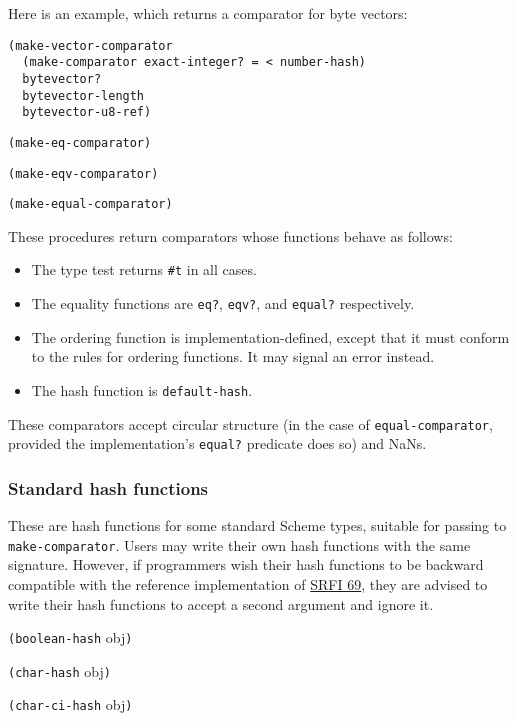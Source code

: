 Here is an example, which returns a comparator for byte vectors:

\begin{verbatim}
(make-vector-comparator
  (make-comparator exact-integer? = < number-hash)
  bytevector?
  bytevector-length
  bytevector-u8-ref)
\end{verbatim}

\texttt{(make-eq-comparator)}

\texttt{(make-eqv-comparator)}

\texttt{(make-equal-comparator)}

These procedures return comparators whose functions behave as follows:

\begin{itemize}
\item
  The type test returns \texttt{\#t} in all cases.
\item
  The equality functions are \texttt{eq?}, \texttt{eqv?}, and
  \texttt{equal?} respectively.
\item
  The ordering function is implementation-defined, except that it must
  conform to the rules for ordering functions. It may signal an error
  instead.
\item
  The hash function is \texttt{default-hash}.
\end{itemize}

These comparators accept circular structure (in the case of
\texttt{equal-comparator}, provided the implementation's \texttt{equal?}
predicate does so) and NaNs.

\hypertarget{Hashfunctions}{\subsubsection{Standard hash
functions}\label{Hashfunctions}}

These are hash functions for some standard Scheme types, suitable for
passing to \texttt{make-comparator}. Users may write their own hash
functions with the same signature. However, if programmers wish their
hash functions to be backward compatible with the reference
implementation of
\href{http://srfi.schemers.org/srfi-69/srfi-69.html}{SRFI 69}, they are
advised to write their hash functions to accept a second argument and
ignore it.

\texttt{(boolean-hash} obj\texttt{)}

\texttt{(char-hash} obj\texttt{)}

\texttt{(char-ci-hash} obj\texttt{)}

